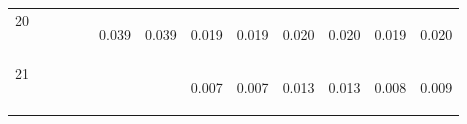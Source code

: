\begin{center}
\begin{tabular}{lcccccccccccc}
20 & \begin{bf}\end{bf} & \begin{rm}\end{rm} & \begin{bf}\end{bf} & \begin{rm}\end{rm} & \begin{bf}0.039\end{bf} & \begin{rm}0.039\end{rm} & \begin{bf}0.019\end{bf} & \begin{rm}0.019\end{rm} & \begin{bf}0.020\end{bf} & \begin{rm}0.020\end{rm} & \begin{bf}0.019\end{bf} & \begin{rm}0.020\end{rm}\\
21 & \begin{bf}\end{bf} & \begin{rm}\end{rm} & \begin{bf}\end{bf} & \begin{rm}\end{rm} & \begin{bf}\end{bf} & \begin{rm}\end{rm} & \begin{bf}0.007\end{bf} & \begin{rm}0.007\end{rm} & \begin{bf}0.013\end{bf} & \begin{rm}0.013\end{rm} & \begin{bf}0.008\end{bf} & \begin{rm}0.009\end{rm}\\

\end{tabular}
\end{center}
